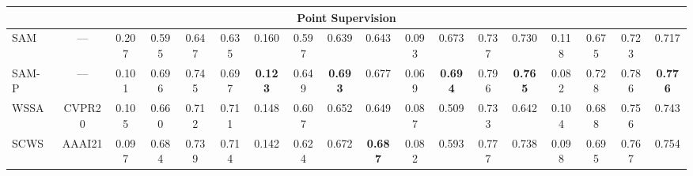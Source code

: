 \begin{table}[t]
{\begin{tabular}{l|c|cccc|cccc|cccc|cccc}
\multicolumn{18}{c}{Point Supervision} \\ \midrule
SAM~\cite{kirillov2023segment} & \multicolumn{1}{c|}{---} & 0.207 & 0.595                                 & 0.647                                 & 0.635                                 & 0.160                                 & 0.597                                 & 0.639                                 & 0.643                                 & 0.093                                 & 0.673                                 & 0.737                                 & 0.730                                 & 0.118                                 & 0.675                                 & 0.723                                 & 0.717                                 \\
SAM-P~\cite{kirillov2023segment} & \multicolumn{1}{c|}{---} & 0.101 & 0.696                                 & 0.745                                 & 0.697                                 & {\color[HTML]{00B0F0} \textbf{0.123}}                                 & 0.649                                 & {\color[HTML]{00B0F0} \textbf{0.693}}                                 & 0.677                                 & 0.069                                 & {\color[HTML]{00B0F0} \textbf{0.694}}                                 & 0.796                                 & {\color[HTML]{00B0F0} \textbf{0.765}}                                 & 0.082                                 & 0.728                                 & 0.786                                 & {\color[HTML]{00B0F0} \textbf{0.776}}                                 \\
WSSA~\cite{zhang2020weakly}                                          & CVPR20                                             & 0.105                                 & 0.660                                 & 0.712                                 & 0.711                                 & 0.148                                 & 0.607                                 & 0.652                                 & 0.649                                 & 0.087                                 & 0.509                                 & 0.733                                 & 0.642                                 & 0.104                                 & 0.688                                 & 0.756                                 & 0.743                                 \\
SCWS~\cite{yu2021structure}                                       & AAAI21                                             & 0.097                                 & 0.684                                 & 0.739                                 & 0.714                                 & 0.142                                 & 0.624                                 & 0.672                                 & {\color[HTML]{00B0F0} \textbf{0.687}}                                 & 0.082                                 & 0.593                                 & 0.777                                 & 0.738                                 & 0.098                                 & 0.695                                 & 0.767                                 & 0.754                                 \\

\end{tabular}}
\end{table}

